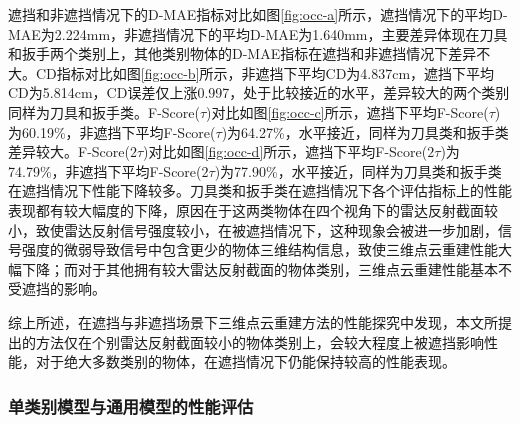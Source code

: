 遮挡和非遮挡情况下的D-MAE指标对比如图\ref{fig:occ-a}所示，遮挡情况下的平均D-MAE为2.224mm，非遮挡情况下的平均D-MAE为1.640mm，主要差异体现在刀具和扳手两个类别上，其他类别物体的D-MAE指标在遮挡和非遮挡情况下差异不大。CD指标对比如图\ref{fig:occ-b}所示，非遮挡下平均CD为4.837cm，遮挡下平均CD为5.814cm，CD误差仅上涨0.997，处于比较接近的水平，差异较大的两个类别同样为刀具和扳手类。F-Score($\tau$)对比如图\ref{fig:occ-c}所示，遮挡下平均F-Score($\tau$)为60.19\%，非遮挡下平均F-Score($\tau$)为64.27\%，水平接近，同样为刀具类和扳手类差异较大。F-Score($2\tau$)对比如图\ref{fig:occ-d}所示，遮挡下平均F-Score($2\tau$)为74.79\%，非遮挡下平均F-Score($2\tau$)为77.90\%，水平接近，同样为刀具类和扳手类在遮挡情况下性能下降较多。刀具类和扳手类在遮挡情况下各个评估指标上的性能表现都有较大幅度的下降，原因在于这两类物体在四个视角下的雷达反射截面较小，致使雷达反射信号强度较小，在被遮挡情况下，这种现象会被进一步加剧，信号强度的微弱导致信号中包含更少的物体三维结构信息，致使三维点云重建性能大幅下降；而对于其他拥有较大雷达反射截面的物体类别，三维点云重建性能基本不受遮挡的影响。

综上所述，在遮挡与非遮挡场景下三维点云重建方法的性能探究中发现，本文所提出的方法仅在个别雷达反射截面较小的物体类别上，会较大程度上被遮挡影响性能，对于绝大多数类别的物体，在遮挡情况下仍能保持较高的性能表现。

\subsubsection{单类别模型与通用模型的性能评估}

